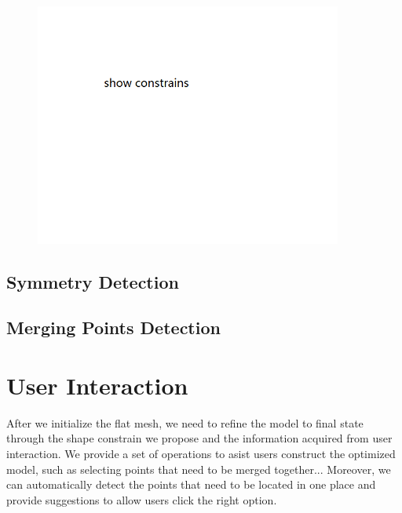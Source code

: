 \documentclass[submission]{gmp2018}
\begin{document}
\begin{figure}
	\centering
	\includegraphics[width=0.9\textwidth]{images/constrain.png}
	\caption{}
	\label{fig:constrain}
\end{figure}

\subsection{Symmetry Detection}

\subsection{Merging Points Detection}


\section{User Interaction}\label{sec:interaction}
After we initialize the flat mesh, we need to refine the model to final state through the shape constrain we propose and the information acquired from user interaction. We provide a set of operations to asist users construct the optimized model, such as selecting points that need to be merged together... Moreover, we can automatically detect the points that need to be located in one place and provide suggestions to allow users click the right option.
\end{document}

